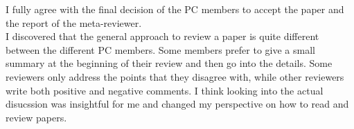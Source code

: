 \documentclass[a4paper]{article}
\begin{document}
I fully agree with the final decision of the PC members to accept the paper and the report of the meta-reviewer.\\
I discovered that the general approach to review a paper is quite different between the different PC members. Some members prefer to give a small summary at the beginning of their review and then go into the details. Some reviewers only address the points that they disagree with, while other reviewers write both positive and negative comments. I think looking into the actual disucssion was insightful for me and changed my perspective on how to read and review papers.
\end{document}
